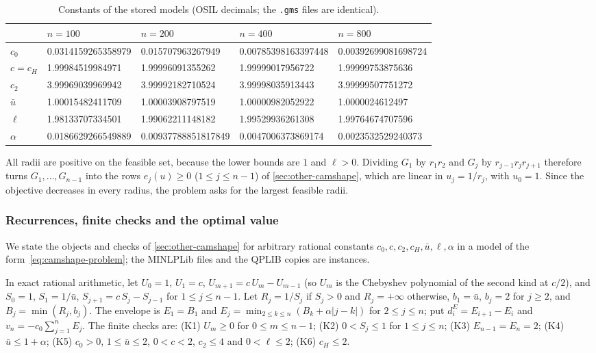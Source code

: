 \begin{table}[ht]
\centering
\small
\caption{Constants of the stored  models (OSIL decimals; the \texttt{.gms} files are identical).}
\label{tab:camshape-constants}
\begin{tabular}{@{}lllll@{}}
\toprule
 & $n = 100$ & $n = 200$ & $n = 400$ & $n = 800$ \\
\midrule
$c_0$ & 0.0314159265358979 & 0.015707963267949 & 0.00785398163397448 & 0.00392699081698724 \\
$c = c_H$ & 1.99984519984971 & 1.99996091355262 & 1.99999017956722 & 1.99999753875636 \\
$c_2$ & 3.99969039969942 & 3.99992182710524 & 3.99998035913443 & 3.99999507751272 \\
$\bar u$ & 1.00015482411709 & 1.00003908797519 & 1.00000982052922 & 1.0000024612497 \\
$\ell$ & 1.98133707334501 & 1.99062211148182 & 1.99529936261308 & 1.99764674707596 \\
$\alpha$ & 0.0186629266549889 & 0.00937788851817849 & 0.0047006373869174 & 0.0023532529240373 \\
\bottomrule
\end{tabular}
\end{table}

All radii are positive on the feasible set, because the lower bounds are $1$ and $\ell > 0$.
Dividing $G_1$ by $r_1r_2$ and $G_j$ by $r_{j-1}r_jr_{j+1}$ therefore turns $G_1,\dots,G_{n-1}$ into the rows $e_j(u) \ge 0$ ($1 \le j \le n-1$) of \cref{sec:other-camshape}, which are linear in $u_j = 1/r_j$, with $u_0 = 1$.
Since the objective decreases in every radius, the problem asks for the largest feasible radii.

\subsubsection{Recurrences, finite checks and the optimal value}\label{app:camshape-proof}

We state the objects and checks of \cref{sec:other-camshape} for arbitrary rational constants $c_0, c, c_2, c_H, \bar u, \ell, \alpha$ in a model of the form~\eqref{eq:camshape-problem}; the MINLPLib files and the QPLIB copies are instances.

\begin{definition}\label{def:camshape-envelope}
In exact rational arithmetic, let $U_0 = 1$, $U_1 = c$, $U_{m+1} = c\,U_m - U_{m-1}$ (so $U_m$ is the Chebyshev polynomial of the second kind at $c/2$), and $S_0 = 1$, $S_1 = 1/\bar u$, $S_{j+1} = c\,S_j - S_{j-1}$ for $1 \le j \le n-1$.
Let $R_j = 1/S_j$ if $S_j > 0$ and $R_j = +\infty$ otherwise, $b_1 = \bar u$, $b_j = 2$ for $j \ge 2$, and $B_j = \min(R_j, b_j)$.
The envelope is $E_1 = B_1$ and $E_j = \min_{2 \le k \le n}(B_k + \alpha|j-k|)$ for $2 \le j \le n$; put $d^E_i = E_{i+1} - E_i$ and $v_n = -c_0\sum_{j=1}^n E_j$.
The finite checks are:
(K1) $U_m \ge 0$ for $0 \le m \le n-1$;
(K2) $0 < S_j \le 1$ for $1 \le j \le n$;
(K3) $E_{n-1} = E_n = 2$;
(K4) $\bar u \le 1 + \alpha$;
(K5) $c_0 > 0$, $1 \le \bar u \le 2$, $0 < c < 2$, $c_2 \le 4$ and $0 < \ell \le 2$;
(K6) $c_H \le 2$.
\end{definition}

